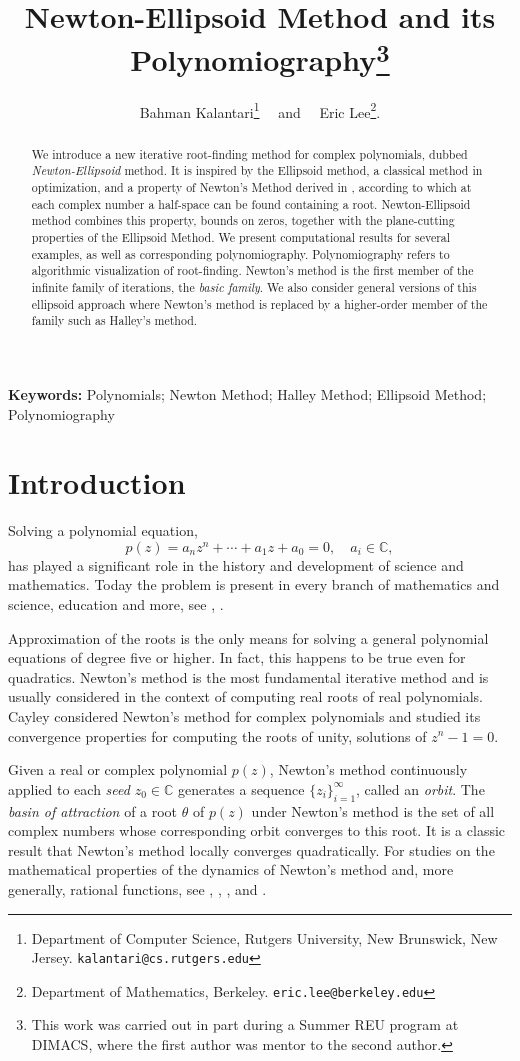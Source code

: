 \documentclass{article}
\title{Newton-Ellipsoid Method and its Polynomiography\thanks{This work was carried out in part during a Summer REU program at DIMACS, where the first author was mentor to the second author.}}
\author{Bahman Kalantari\thanks{Department of Computer Science,
        Rutgers University, New Brunswick, New Jersey. {\tt kalantari@cs.rutgers.edu}}
        ~~and~~ Eric Lee\thanks{Department of Mathematics,
        Berkeley. {\tt eric.lee@berkeley.edu}}.}
\date{}
\begin{document}
\maketitle
\begin{abstract}
 We introduce a new iterative root-finding method for complex polynomials, dubbed {\it Newton-Ellipsoid} method.  It is inspired by the Ellipsoid method, a classical method in optimization, and a property of Newton's Method derived in \cite{kalFTA}, according to which at each complex number a half-space can be found containing a root. Newton-Ellipsoid method combines this property, bounds on zeros, together with the plane-cutting properties of the Ellipsoid Method. We present computational results for several examples, as well as corresponding polynomiography. Polynomiography refers to algorithmic visualization of
 root-finding.  Newton's method is the first member of the infinite family of iterations, the {\it basic family}. We also consider general versions of this ellipsoid approach where Newton's method is replaced by a higher-order member of the family such as Halley's method.
\end{abstract}

{\bf Keywords:}    Polynomials; Newton Method; Halley Method; Ellipsoid Method; Polynomiography

\section{Introduction} Solving a polynomial equation,
\begin{equation}
p(z)=a_nz^n+ \cdots +a_1z+a_0=0,  \quad a_i \in \mathbb{C},
\end{equation}
has played a significant role in the history and development of science and mathematics.  Today the problem is present in every branch of mathematics and science, education and more, see \cite{pan97}, \cite{kalbook}.

Approximation of the roots is the only means for solving a general polynomial equations of degree five or higher. In fact, this happens to be true even for quadratics. Newton's method is the most fundamental iterative method and is usually considered in the context of  computing real roots of real polynomials. Cayley \cite{cay} considered Newton's method for complex polynomials and studied its convergence properties for computing the roots of unity, solutions of $z^n-1=0$.

Given a real or complex polynomial $p(z)$, Newton's method continuously applied to each {\it seed} $z_0 \in \mathbb{C}$ generates a sequence $\{z_i \}_{i=1}^\infty$, called an {\it orbit}.  The {\it basin of attraction} of  a root $\theta$ of  $p(z)$ under Newton's method is the set of all complex numbers whose corresponding orbit converges to this root. It is a classic result that Newton's method locally converges quadratically.  For studies on the mathematical properties of the dynamics of Newton's method and, more generally, rational functions, see \cite{beardon91}, \cite{milnor}, \cite{peit}, and \cite{kalbook}.
\end{document}
